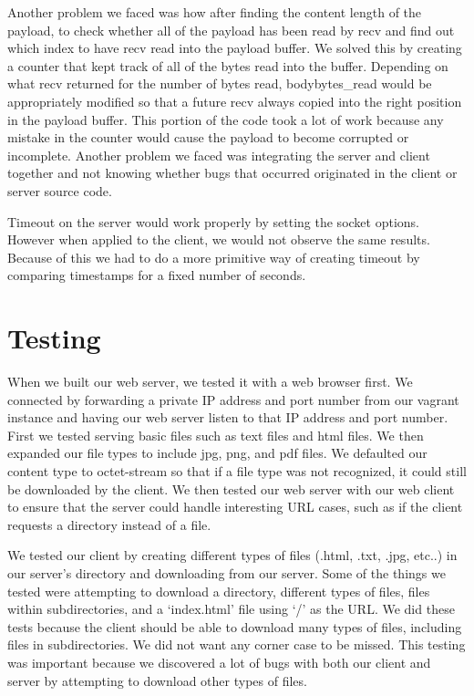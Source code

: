 \documentclass{article}
\begin{document}
    Another problem we faced was how after finding the content length of the
    payload, to check whether all of the payload has been read by recv and find
    out which index to have recv read into the payload buffer. We solved this
    by creating a counter that kept track of all of the bytes read into the
    buffer. Depending on what recv returned for the number of bytes read,
    bodybytes\_read would be appropriately modified so that a future recv
    always copied into the right position in the payload buffer. This portion
    of the code took a lot of work because any mistake in the counter would
    cause the payload to become corrupted or incomplete. Another problem we
    faced was integrating the server and client together and not knowing
    whether bugs that occurred originated in the client or server source code.

    Timeout on the server would work properly by setting the socket options.
    However when applied to the client, we would not observe the same results.
    Because of this we had to do a more primitive way of creating timeout by
    comparing timestamps for a fixed number of seconds.

\section{Testing}
    When we built our web server, we tested it with a web browser first. We
    connected by forwarding a private IP address and port number from our
    vagrant instance and having our web server listen to that IP address and
    port number. First we tested serving basic files such as text files and
    html files. We then expanded our file types to include jpg, png, and pdf
    files. We defaulted our content type to octet-stream so that if a file type
    was not recognized, it could still be downloaded by the client. We then
    tested our web server with our web client to ensure that the server could
    handle interesting URL cases, such as if the client requests a directory
    instead of a file.
    
    We tested our client by creating different types of files (.html, .txt,
    .jpg, etc..)  in our server's directory and downloading from our server.
    Some of the things we tested were attempting to download a directory,
    different types of files, files within subdirectories, and a `index.html'
    file using `/' as the URL. We did these tests because the client should be
    able to download many types of files, including files in subdirectories. We
    did not want any corner case to be missed. This testing was important
    because we discovered a lot of bugs with both our client and server by
    attempting to download other types of files.
\end{document}
